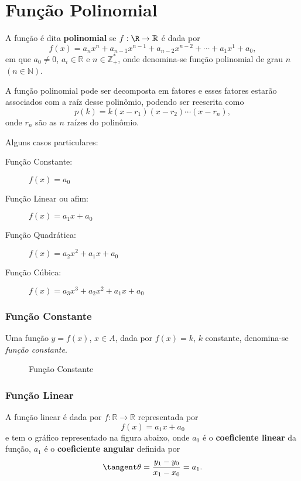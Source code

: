 
\section{Função Polinomial}
\label{sec:função_polinomial}
	
	A função é dita \textbf{polinomial} se $f:\R \rightarrow \mathbb{R}$ é dada por
	\begin{equation}
		f(x) = a_nx^{n} + a_{n-1}x^{n-1} + a_{n-2}x^{n-2} + \cdots + a_1x^{1} + a_0,
	\end{equation}
	em que $a_0 \neq 0$, $a_i \in \mathbb{R}$ e $n \in \mathbb{Z}_{+}^{*}$, onde denomina-se função polinomial de grau $n$ $(n \in \mathbb{N})$.
	
	A função polinomial pode ser decomposta em fatores e esses fatores estarão associados com a raíz desse polinômio, podendo ser reescrita como \[
		p(k) = k(x-r_1)(x-r_2) \cdots (x-r_n)
	,\] onde $r_n$ são as  $n$ raízes do polinômio.

	Alguns casos particulares:
	\begin{description}
		\item[Função Constante:] $f(x) = a_0$ 
		\item[Função Linear ou afim:] $f(x) = a_1x + a_0$
		\item[Função Quadrática:] $f(x) = a_2x^2 + a_1x + a_0$
		\item[Função Cúbica:]  $f(x) = a_3x^3 + a_2x^2 + a_1x + a_0$
	\end{description}

	\subsubsection{Função Constante}
	\label{sec:função_constante}
	
	Uma função $y = f(x)$, $x \in A$, dada por $f(x) = k$, $k$ constante, denomina-se \textit{função constante}.

\begin{figure}[ht]
    \centering
   \caption{Função Constante}
   \label{fig:func_const}
\end{figure}


	\subsubsection{Função Linear}
	\label{sec:função_linear}
	
	A função linear é dada por $f:\mathbb{R}\rightarrow \mathbb{R}$ representada por
	\begin{equation}
		f(x) = a_1x + a_0
	\end{equation}
	e tem o gráfico representado na figura abaixo, onde $a_0$ é o \textbf{coeficiente linear} da função, $a_1$ é o \textbf{coeficiente angular} definida por \[
	\tangent \theta = \frac{y_1 - y_0}{x_1 - x_0} = a_1
.\]		
